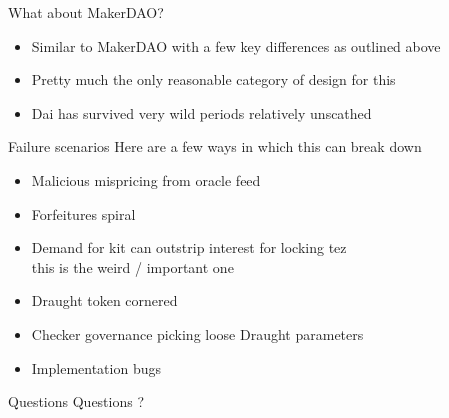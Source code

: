 \documentclass[handout]{beamer}
\newcommand{\yel}[
  1]{{\color{yellow} #1}}
\begin{document}
\begin{frame}{What about MakerDAO?}
  \begin{itemize}
  \item Similar to MakerDAO with a few key differences as outlined above
  \item Pretty much the only reasonable category of design for this
  \item Dai has survived very wild periods relatively unscathed
  \end{itemize}
\end{frame}

\begin{frame}{Failure scenarios}
  Here are a few ways in which this can break down
  \begin{itemize}
  \item Malicious \yel{mispricing} from oracle feed 
  \item Forfeitures \yel{spiral}
  \item Demand for kit can outstrip interest for locking tez\\
    \yel{this is the weird / important one}
  \item Draught token cornered
  \item Checker governance picking loose Draught parameters
  \item Implementation \yel{bugs}
  \end{itemize}
\end{frame}

\begin{frame}{Questions}
  Questions ?
\end{frame}
  


  
\end{document}
